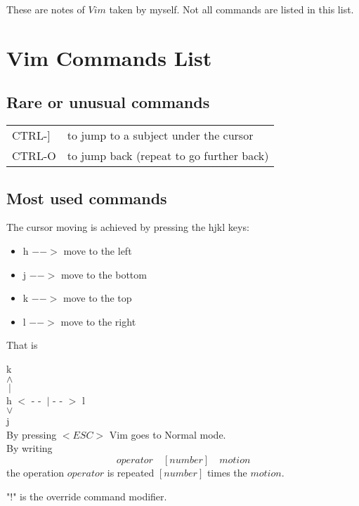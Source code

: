 \documentclass[11p]{book}
\begin{document}
These are notes of $Vim$ taken by myself. Not all commands are listed in this list.
\chapter*{Vim Commands List}
\newpage

\section*{Rare or unusual commands}
\begin{tabular}{p{4cm} l}
CTRL-] & to jump to a subject under the cursor\\
CTRL-O & to jump back (repeat to go further back)\\
\hline
\end{tabular}
\newpage

\section*{Most used commands}
The cursor moving is achieved by pressing the hjkl keys:
\begin{itemize}
\item h $-->$ move to the left
\item j $-->$ move to the bottom
\item k $-->$ move to the top
\item l $-->$ move to the right
\end{itemize}

That is

\hspace*{8cm}k \\
\hspace*{8.5cm}$\wedge$\\
\hspace*{8.5cm}$\>|$\\
\hspace*{7.32cm}h $<$ - - $\>|$ - - $>$ l \\
\hspace*{8.5cm}$\vee$ \\
\hspace*{8.6cm}j \\

By pressing $<ESC>$ Vim goes to Normal mode. \\

By writing $$operator \quad [number] \quad motion$$ the operation $operator$ is repeated $[number]$ times the $motion$. 

"$!$" \hspace*{0.1cm} is the override command modifier.
\end{document}
